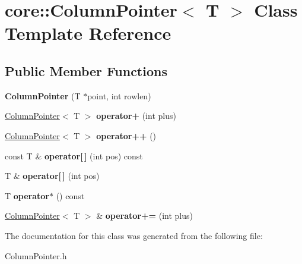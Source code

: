 \hypertarget{classcore_1_1_column_pointer}{}\section{core\+:\+:Column\+Pointer$<$ T $>$ Class Template Reference}
\label{classcore_1_1_column_pointer}
\subsection*{Public Member Functions}
\begin{DoxyCompactItemize}
\item 
\mbox{\label{classcore_1_1_column_pointer_a940c054b26cb4592108603aef37f8d8e}} 
{\bfseries Column\+Pointer} (T $\ast$point, int rowlen)
\item 
\mbox{\label{classcore_1_1_column_pointer_a4a434a9dc69c42e136a5b2ee0c2ebc08}} 
\mbox{\hyperlink{classcore_1_1_column_pointer}{Column\+Pointer}}$<$ T $>$ {\bfseries operator+} (int plus)
\item 
\mbox{\label{classcore_1_1_column_pointer_a27b58760aa6ec08df50f4ab8031c7dd2}} 
\mbox{\hyperlink{classcore_1_1_column_pointer}{Column\+Pointer}}$<$ T $>$ {\bfseries operator++} ()
\item 
\mbox{\label{classcore_1_1_column_pointer_ab6caebe828fb597c3dc7d834e22a633e}} 
const T \& {\bfseries operator\mbox{[}$\,$\mbox{]}} (int pos) const
\item 
\mbox{\label{classcore_1_1_column_pointer_ad0506cea37564b8ae097f1657ec8fddf}} 
T \& {\bfseries operator\mbox{[}$\,$\mbox{]}} (int pos)
\item 
\mbox{\label{classcore_1_1_column_pointer_ac46c994c4452acbdf42f2f3e6ff9c256}} 
T {\bfseries operator$\ast$} () const
\item 
\mbox{\label{classcore_1_1_column_pointer_abeb0908db5ea8f6756be0799d0a16a4c}} 
\mbox{\hyperlink{classcore_1_1_column_pointer}{Column\+Pointer}}$<$ T $>$ \& {\bfseries operator+=} (int plus)
\end{DoxyCompactItemize}


The documentation for this class was generated from the following file\+:\begin{DoxyCompactItemize}
\item 
Column\+Pointer.\+h\end{DoxyCompactItemize}
